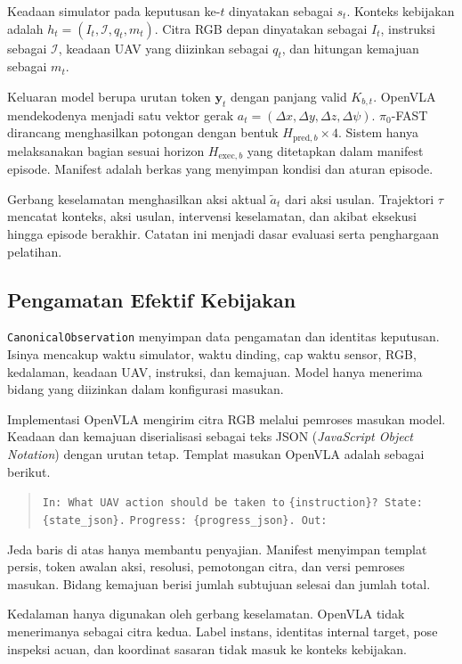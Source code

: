 Keadaan simulator pada keputusan ke-$t$ dinyatakan sebagai $s_t$. Konteks kebijakan adalah $h_t=(I_t,\mathcal I,q_t,m_t)$. Citra RGB depan dinyatakan sebagai $I_t$, instruksi sebagai $\mathcal I$, keadaan UAV yang diizinkan sebagai $q_t$, dan hitungan kemajuan sebagai $m_t$.

Keluaran model berupa urutan token $\mathbf y_t$ dengan panjang valid $K_{b,t}$. OpenVLA mendekodenya menjadi satu vektor gerak $a_t=(\Delta x,\Delta y,\Delta z,\Delta\psi)$. $\pi_0$-FAST dirancang menghasilkan potongan dengan bentuk $H_{\mathrm{pred},b}\times4$. Sistem hanya melaksanakan bagian sesuai horizon $H_{\mathrm{exec},b}$ yang ditetapkan dalam manifest episode. Manifest adalah berkas yang menyimpan kondisi dan aturan episode.

Gerbang keselamatan menghasilkan aksi aktual $\tilde a_t$ dari aksi usulan. Trajektori $\tau$ mencatat konteks, aksi usulan, intervensi keselamatan, dan akibat eksekusi hingga episode berakhir. Catatan ini menjadi dasar evaluasi serta penghargaan pelatihan.

\subsection{Pengamatan Efektif Kebijakan}
\label{subsec:canonical_observation}
\texttt{CanonicalObservation} menyimpan data pengamatan dan identitas keputusan. Isinya mencakup waktu simulator, waktu dinding, cap waktu sensor, RGB, kedalaman, keadaan UAV, instruksi, dan kemajuan. Model hanya menerima bidang yang diizinkan dalam konfigurasi masukan.

Implementasi OpenVLA mengirim citra RGB melalui pemroses masukan model. Keadaan dan kemajuan diserialisasi sebagai teks JSON (\textit{JavaScript Object Notation}) dengan urutan tetap. Templat masukan OpenVLA adalah sebagai berikut.
\begin{quote}
\small
\texttt{In: What UAV action should be taken to}\newline
\texttt{\{instruction\}? State: \{state\_json\}.}\newline
\texttt{Progress: \{progress\_json\}. Out:}
\end{quote}
Jeda baris di atas hanya membantu penyajian. Manifest menyimpan templat persis, token awalan aksi, resolusi, pemotongan citra, dan versi pemroses masukan. Bidang kemajuan berisi jumlah subtujuan selesai dan jumlah total.

Kedalaman hanya digunakan oleh gerbang keselamatan. OpenVLA tidak menerimanya sebagai citra kedua. Label instans, identitas internal target, pose inspeksi acuan, dan koordinat sasaran tidak masuk ke konteks kebijakan.

